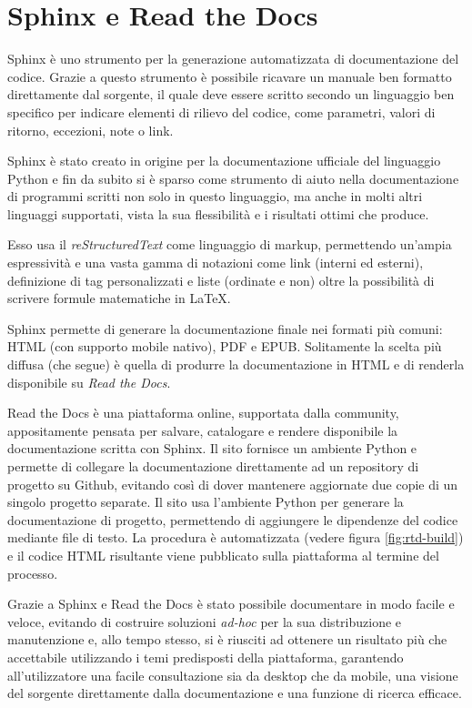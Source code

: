 
\section{Sphinx e Read the Docs}
\label{seq:sphinx-rtd}
Sphinx è uno strumento per la generazione automatizzata di documentazione
del codice. Grazie a questo strumento è possibile ricavare un manuale
ben formatto direttamente dal sorgente, il quale deve essere scritto
secondo un linguaggio ben specifico per indicare elementi di rilievo
del codice, come parametri, valori di ritorno, eccezioni,
note o link.

Sphinx è stato creato in origine per la documentazione ufficiale
del linguaggio Python\cite{python-doc} e fin da subito si è sparso
come strumento di aiuto nella documentazione di programmi scritti
non solo in questo linguaggio, ma anche in molti altri linguaggi supportati,
vista la sua flessibilità e i risultati ottimi che produce.

Esso usa il \emph{reStructuredText} come linguaggio di markup, permettendo
un'ampia espressività e una vasta gamma di notazioni come link (interni ed esterni),
definizione di tag personalizzati e liste (ordinate e non) oltre la possibilità
di scrivere formule matematiche in \LaTeX.

Sphinx permette di generare la documentazione finale nei formati più comuni:
HTML (con supporto mobile nativo), PDF e EPUB. Solitamente la scelta
più diffusa (che \pygfa segue) è quella di produrre la documentazione in
HTML e di renderla disponibile su \emph{Read the Docs}.

\label{seq:sphinx}
Read the Docs è una piattaforma online, supportata dalla community,
appositamente pensata per salvare, catalogare e rendere disponibile
la documentazione scritta con Sphinx.
Il sito fornisce un ambiente Python e permette di collegare la documentazione
direttamente ad un repository di progetto su Github, evitando così di
dover mantenere aggiornate due copie di un singolo progetto separate.
Il sito usa l'ambiente Python per generare la documentazione di
progetto, permettendo di aggiungere le dipendenze del codice mediante
file di testo. La procedura è automatizzata (vedere figura
\ref{fig:rtd-build}) e il codice HTML risultante viene pubblicato sulla
piattaforma al termine del processo.

Grazie a Sphinx e Read the Docs è stato possibile documentare \pygfa
in modo facile e veloce, evitando di costruire soluzioni \emph{ad-hoc}
per la sua distribuzione e manutenzione e, allo tempo stesso,
si è riusciti ad ottenere un risultato più che accettabile utilizzando
i temi predisposti della piattaforma, garantendo all'utilizzatore
una facile consultazione sia da desktop che da mobile, una visione
del sorgente direttamente dalla documentazione e una funzione
di ricerca efficace.

